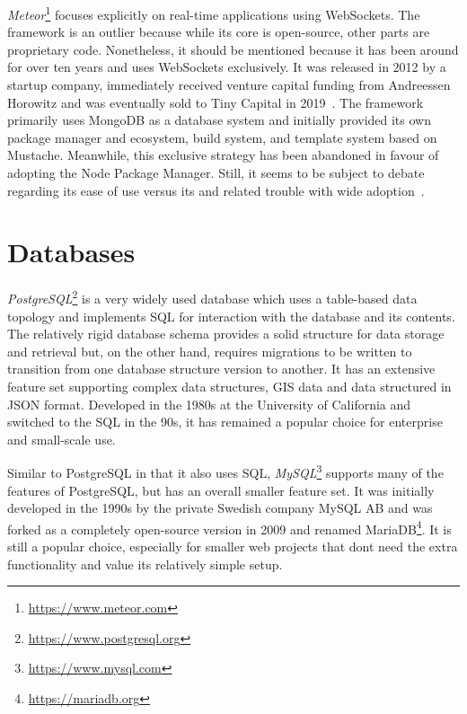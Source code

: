 \emph{Meteor}\footnote{\url{https://www.meteor.com}} focuses explicitly on real-time applications using WebSockets.
The framework is an outlier because while its core is open-source, other parts are proprietary code.
Nonetheless, it should be mentioned because it has been around for over ten years and uses WebSockets exclusively.
It was released in 2012 by a startup company, immediately received venture capital funding from Andreessen Horowitz and was eventually sold to Tiny Capital in 2019~\parencite{meteorSaleTinyCapital}.
The framework primarily uses MongoDB as a database system and initially provided its own package manager and ecosystem, build system, and template system based on Mustache.
Meanwhile, this exclusive strategy has been abandoned in favour of adopting the Node Package Manager.
Still, it seems to be subject to debate regarding its ease of use versus its  and related trouble with wide adoption~\parencite{meteorDiscussionYCombinator}.

\section{Databases}
\label{sec:databases}



\emph{PostgreSQL}\footnote{\url{https://www.postgresql.org}} is a very widely used database which uses a table-based data topology and implements \ac{SQL} for interaction with the database and its contents.
The relatively rigid database schema provides a solid structure for data storage and retrieval but, on the other hand, requires migrations to be written to transition from one database structure version to another.
It has an extensive feature set supporting complex data structures, \ac{GIS} data and data structured in \ac{JSON} format.
Developed in the 1980s at the University of California and switched to the \ac{SQL} in the 90s, it has remained a popular choice for enterprise and small-scale use.

Similar to PostgreSQL in that it also uses \ac{SQL}, \emph{MySQL}\footnote{\url{https://www.mysql.com}} supports many of the features of PostgreSQL, but has an overall smaller feature set.
It was initially developed in the 1990s by the private Swedish company MySQL AB and was forked as a completely open-source version in 2009 and renamed MariaDB\footnote{\url{https://mariadb.org}}.
It is still a popular choice, especially for smaller web projects that don\textquotesingle t need the extra functionality and value its relatively simple setup.

